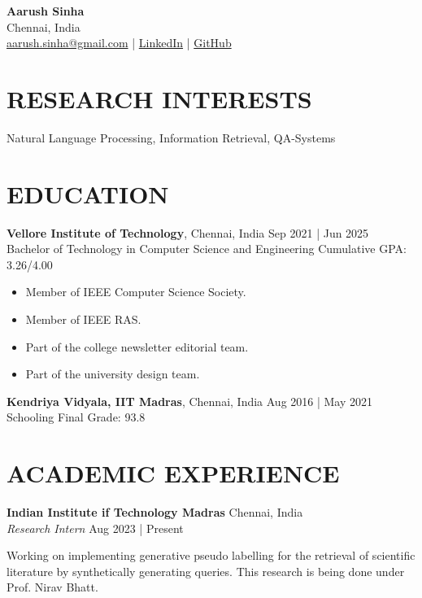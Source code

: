 \documentclass[a4paper,9pt]{extarticle}
\begin{document}
\begin{flushleft}
    \textbf{\LARGE Aarush Sinha}\\[2pt] %
    Chennai, India \\
    \href{mailto:aarush.sinha@gmail.com}{aarush.sinha@gmail.com} | \href{https://www.linkedin.com/in/asj10/}{LinkedIn} | \href{https://github.com/chungimungi}{GitHub} %
\end{flushleft}

\section*{RESEARCH INTERESTS}
\noindent
Natural Language Processing, Information Retrieval, QA-Systems

\section*{EDUCATION}
\noindent
\textbf{Vellore Institute of Technology}, Chennai, India \hfill Sep 2021 | Jun 2025\\ %
Bachelor of Technology in Computer Science and Engineering \hfill Cumulative GPA: 3.26/4.00 \\
\begin{itemize}
    \item Member of IEEE Computer Science Society.
    \item Member of IEEE RAS.
    \item Part of the college newsletter editorial team.
    \item Part of the university design team.
\end{itemize}

\noindent
\textbf{Kendriya Vidyala, IIT Madras}, Chennai, India \hfill Aug 2016 | May 2021\\ %
Schooling \hfill Final Grade: 93.8 %

\section*{ACADEMIC EXPERIENCE}
\noindent
\textbf{Indian Institute if Technology Madras} \hfill Chennai, India\\ %
\textit{Research Intern} \hfill Aug 2023 | Present %

Working on implementing generative pseudo labelling for the retrieval of scientific literature by synthetically generating queries. This research is being done under Prof. Nirav Bhatt.
\end{document}
